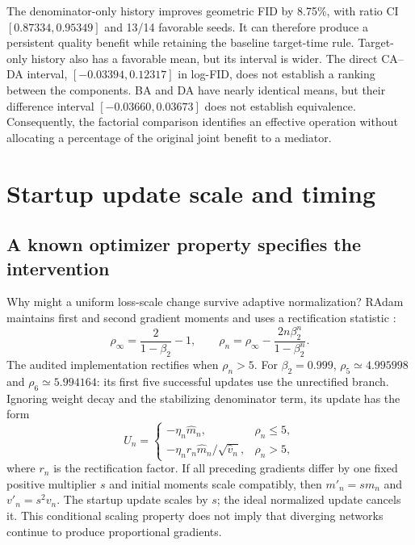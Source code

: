 The denominator-only history improves geometric FID by 8.75\%, with ratio CI $[0.87334,0.95349]$ and 13/14 favorable seeds. It can therefore produce a persistent quality benefit while retaining the baseline target-time rule. Target-only history also has a favorable mean, but its interval is wider. The direct CA--DA interval, $[-0.03394,0.12317]$ in log-FID, does not establish a ranking between the components. BA and DA have nearly identical means, but their difference interval $[-0.03660,0.03673]$ does not establish equivalence. Consequently, the factorial comparison identifies an effective operation without allocating a percentage of the original joint benefit to a mediator.

\section{Startup update scale and timing}
\label{sec:startup}
\subsection{A known optimizer property specifies the intervention}
Why might a uniform loss-scale change survive adaptive normalization? RAdam maintains first and second gradient moments and uses a rectification statistic \citep{liu2020radam}:
\begin{equation}
 \rho_\infty=\frac{2}{1-\beta_2}-1,\qquad
 \rho_n=\rho_\infty-\frac{2n\beta_2^n}{1-\beta_2^n}.
 \label{eq:rho}
\end{equation}
The audited implementation rectifies when $\rho_n>5$. For $\beta_2=0.999$, $\rho_5\simeq4.995998$ and $\rho_6\simeq5.994164$: its first five successful updates use the unrectified branch. Ignoring weight decay and the stabilizing denominator term, its update has the form
\begin{equation}
 U_n=\begin{cases}
 -\eta_n\widehat m_n,&\rho_n\leq5,\\
 -\eta_n r_n\widehat m_n/\sqrt{\widehat v_n},&\rho_n>5,
 \end{cases}
 \label{eq:radam}
\end{equation}
where $r_n$ is the rectification factor. If all preceding gradients differ by one fixed positive multiplier $s$ and initial moments scale compatibly, then $m'_n=sm_n$ and $v'_n=s^2v_n$. The startup update scales by $s$; the ideal normalized update cancels it. This conditional scaling property does not imply that diverging networks continue to produce proportional gradients.

